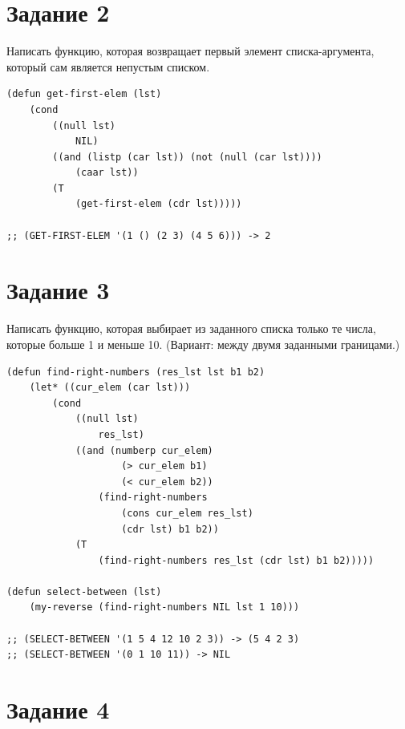 \documentclass[a4paper,14pt, unknownkeysallowed]{extreport}
\begin{document}
\section{Задание 2}

Написать функцию, которая возвращает первый элемент списка-аргумента, который сам является непустым списком.

\begin{center}
\captionsetup{justification=raggedright,singlelinecheck=off}
\begin{lstlisting}[label=lst:parallel_processing,caption=Решение задания 2]
(defun get-first-elem (lst)
    (cond
        ((null lst)
            NIL)
        ((and (listp (car lst)) (not (null (car lst))))
            (caar lst))
        (T  
            (get-first-elem (cdr lst)))))

;; (GET-FIRST-ELEM '(1 () (2 3) (4 5 6))) -> 2
\end{lstlisting}
\end{center}

\section{Задание 3}

Написать функцию, которая выбирает из заданного списка только те числа, которые больше 1 и меньше 10. (Вариант: между двумя заданными границами.)

\begin{center}
\captionsetup{justification=raggedright,singlelinecheck=off}
\begin{lstlisting}[label=lst:parallel_processing,caption=Решение задания 3]
(defun find-right-numbers (res_lst lst b1 b2)
    (let* ((cur_elem (car lst)))
        (cond
            ((null lst)
                res_lst)
            ((and (numberp cur_elem) 
                    (> cur_elem b1)
                    (< cur_elem b2))
                (find-right-numbers 
                    (cons cur_elem res_lst)
                    (cdr lst) b1 b2))
            (T 
                (find-right-numbers res_lst (cdr lst) b1 b2)))))

(defun select-between (lst)
    (my-reverse (find-right-numbers NIL lst 1 10)))

;; (SELECT-BETWEEN '(1 5 4 12 10 2 3)) -> (5 4 2 3)
;; (SELECT-BETWEEN '(0 1 10 11)) -> NIL
\end{lstlisting}
\end{center}

\section{Задание 4}
\end{document}
